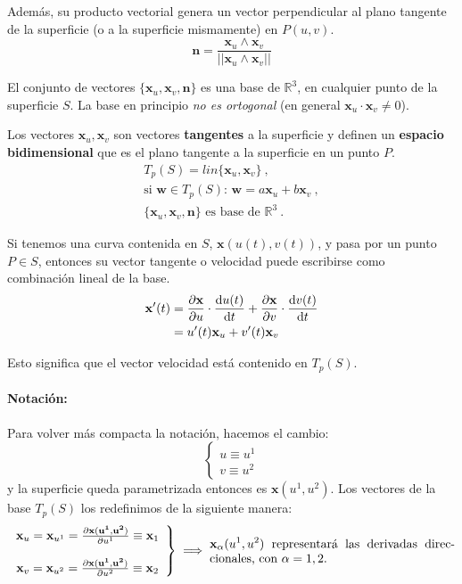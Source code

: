 Además, su producto vectorial genera un vector perpendicular al plano tangente de la superficie (o a la superficie mismamente) en $P(u,v)$.
$$
\mathbf{n}=\frac{\mathbf{x}_u \wedge \mathbf{x}_v}{||\mathbf{x}_u \wedge \mathbf{x}_v||}
$$

    
El conjunto de vectores $\{ \mathbf{x}_u,\mathbf{x}_v,\mathbf{n} \}$ es una base de $\mathbb{R}^3$, en cualquier punto de la superficie $S$. La base en principio \emph{no es ortogonal} (en general $\mathbf{x}_u\cdot \mathbf{x}_v\neq 0$).\\

\begin{mybox}
Los vectores $\mathbf{x}_u,\mathbf{x}_v$ son vectores \textbf{tangentes} a la superficie y definen un \textbf{espacio bidimensional} que es el plano tangente a la superficie en un punto $P$.
\begin{gather*}
T_p(S)=lin\{ \mathbf{x}_u,\mathbf{x}_v \} \ ,\\
\text{si $\mathbf{w}\in T_p(S)$: }\mathbf{w}=a\mathbf{x}_u+b\mathbf{x}_v \ ,\\
\{ \mathbf{x}_u,\mathbf{x}_v,\mathbf{n} \} \text{ es base de }\mathbb{R}^3\ .
\end{gather*}
\end{mybox}

Si tenemos una curva contenida en $S$, $\mathbf{x}(u(t),v(t))$, y pasa por un punto $P\in S$, entonces su vector tangente o velocidad puede escribirse como combinación lineal de la base.
\begin{equation*}
\begin{split}
\mathbf{x'}(t)&=\pdv{\mathbf{x}}{u}(u(t),v(t))\cdot \dv{u(t)}{t}+\pdv{\mathbf{x}}{v}(u(t),v(t))\cdot \dv{v(t)}{t}\\
          &=u'(t)\mathbf{x}_u+v'(t)\mathbf{x}_v
\end{split}
\end{equation*}

Esto significa que el vector velocidad está contenido en $T_p(S)$.
\paragraph{Notación:} Para volver más compacta la notación, hacemos el cambio:
$$
\left \{ 
\begin{array}{c}
     u\equiv u^1  \\
     v\equiv u^2 
\end{array}
\right .
$$
y la superficie queda parametrizada entonces es $\mathbf{x}(u^1,u^2)$. Los vectores de la base $T_p(S)$ los redefinimos de la siguiente manera:
$$
\left .
\begin{array}{c}
     \mathbf{x}_u=\mathbf{x}_{u^1}=\pdv{\mathbf{x(u^1,u^2)}}{u^1}\equiv \mathbf{x}_1  \\\\
     \mathbf{x}_v=\mathbf{x}_{u^2}=\pdv{\mathbf{x(u^1,u^2)}}{u^2}\equiv \mathbf{x}_2
\end{array} 
\right \} \implies \text{\parbox{7cm}{$\mathbf{x}_\alpha (u^1,u^2)$ representará las derivadas direccionales, con $\alpha=1,2$.}}
$$


